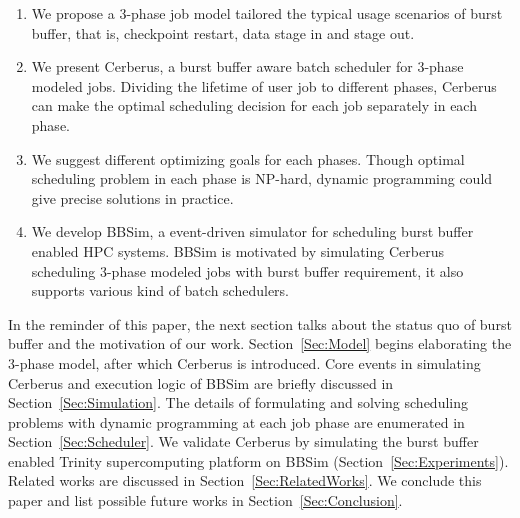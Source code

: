 \begin{enumerate}
        \item %
                We propose a 3-phase job model tailored the typical
                usage scenarios of burst buffer, that is, checkpoint restart,
                data stage in and stage out.
        \item   We present Cerberus,
                a burst buffer aware batch scheduler for 3-phase modeled jobs.
                Dividing the lifetime of user job to different phases,
                Cerberus can make the optimal scheduling decision 
                for each job separately in each phase.
        \item   We suggest different optimizing goals for each phases.
                Though optimal scheduling problem in each phase is NP-hard,
                dynamic programming could give precise solutions
                in practice.
        \item   We develop BBSim, a event-driven simulator for scheduling
                burst buffer enabled HPC systems.
                BBSim is motivated by simulating Cerberus scheduling 
                3-phase modeled jobs with burst buffer requirement,
                it also supports various kind of batch schedulers.
\end{enumerate}


In the reminder of this paper,
the next section talks about the status quo of burst buffer and
the motivation of our work.
Section~\ref{Sec:Model} begins elaborating the 3-phase model,
after which Cerberus is introduced.
Core events in simulating Cerberus and execution logic of BBSim are
briefly discussed in Section~\ref{Sec:Simulation}.
The details of formulating and solving scheduling problems with
dynamic programming at each job phase are enumerated in Section~\ref{Sec:Scheduler}.
We validate Cerberus by simulating the burst buffer enabled
Trinity supercomputing platform on BBSim (Section~\ref{Sec:Experiments}).
Related works are discussed in Section~\ref{Sec:RelatedWorks}.
We conclude this paper and list possible future works in Section~\ref{Sec:Conclusion}.


